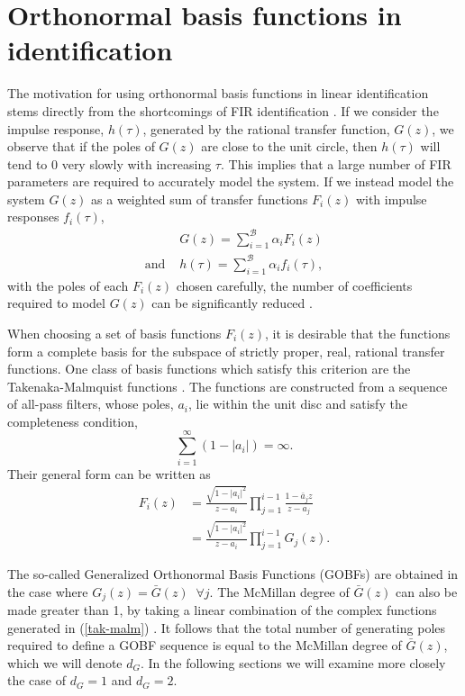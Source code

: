 \section{Orthonormal basis functions in identification}

The motivation for using orthonormal basis functions in linear identification stems directly from the shortcomings of FIR identification \cite{Heuberger2005}.  If we consider the impulse response, $h(\tau)$, generated by the rational transfer function, $G(z)$, we observe that if the poles of $G(z)$ are close to the unit circle, then $h(\tau)$ will tend to 0 very slowly with increasing $\tau$.  This implies that a large number of FIR parameters are required to accurately model the system. If we instead model the system $G(z)$ as a weighted sum of transfer functions $F_i(z)$ with impulse responses $f_i(\tau)$,
\begin{align}
\label{linearBF}
&G(z) = \sum_{i=1}^{\mathcal{B}} \alpha_i F_i(z) \\
\text{and } &h(\tau) = \sum_{i=1}^{\mathcal{B}} \alpha_i f_i(\tau),
\end{align}
with the poles of each $F_i(z)$ chosen carefully, the number of coefficients required to model $G(z)$ can be significantly reduced \cite{Heuberger2005}. 

When choosing a set of basis functions $F_i(z)$, it is desirable that the functions form a complete basis for the subspace of strictly proper, real, rational transfer functions. One class of basis functions which satisfy this criterion are the Takenaka-Malmquist functions \cite{Akcay1998}. The functions are constructed from a sequence of all-pass filters, whose poles, $a_i$, lie within the unit disc and satisfy the completeness condition, $$\sum_{i=1}^{\infty}(1-|a_i|)=\infty.$$ Their general form \cite{Heuberger2005} can be written as 
\begin{equation}
\begin{split}
\label{tak-malm}
F_i(z) &= \frac{\sqrt{1-|a_i|^2}}{z-a_i} \prod_{j=1}^{i-1} \frac{1-\bar{a}_jz}{z-a_j} \\
& = \frac{\sqrt{1-|a_i|^2}}{z-a_i} \prod_{j=1}^{i-1} G_j(z).
\end{split}
\end{equation}

The so-called Generalized Orthonormal Basis Functions (GOBFs) are obtained in the case where $G_j(z) = \bar{G}(z) \; \; \forall j$.  The McMillan degree of $\bar{G}(z)$ can also be made greater than 1, by taking a linear combination of the complex functions generated in (\ref{tak-malm}) \cite{Ninness1997}.  It follows that the total number of generating poles required to define a GOBF sequence is equal to the McMillan degree of $\bar{G}(z)$, which we will denote $d_G$. In the following sections we will examine more closely the case of $d_G =1$ and $d_G = 2$.

